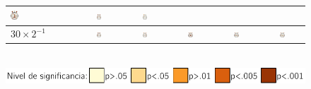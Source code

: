 \begin{figure}
{\begin{tabular}{lccccc}
\includegraphics[width=0.13\textwidth]{./img_art_dfa/cabeza_new_JAE_30.pdf} &
\includegraphics[width=0.13\textwidth]{./img_art_dfa/cabeza_new_GHA_30.pdf} &
\includegraphics[width=0.13\textwidth]{./img_art_dfa/cabeza_new_MFGR_30.pdf} \\
\midrule
$30 \times 2^{-1}$ &
\includegraphics[width=0.13\textwidth]{./img_art_dfa/cabeza_new_VCR_15.pdf} &
\includegraphics[width=0.13\textwidth]{./img_art_dfa/cabeza_new_MJH_15.pdf} &
\includegraphics[width=0.13\textwidth]{./img_art_dfa/cabeza_new_JAE_15.pdf} &
\includegraphics[width=0.13\textwidth]{./img_art_dfa/cabeza_new_GHA_15.pdf} &
\includegraphics[width=0.13\textwidth]{./img_art_dfa/cabeza_new_MFGR_15.pdf} \\
\bottomrule
\end{tabular}\\
\includegraphics[scale=.7]{./img_art_dfa/escala.pdf} \\
}
\end{figure}

